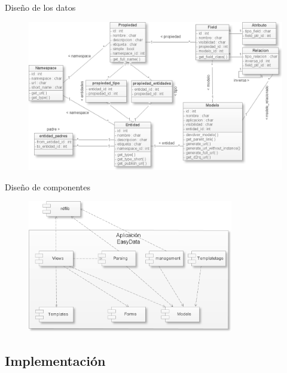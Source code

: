 \documentclass[spanish,xcolor=table,svgnames]{beamer}
\begin{document}
\begin{frame}{Diseño de los datos}
  \begin{figure}[H]
    \begin{center}
        \includegraphics[width=1.0\textwidth]{img/modelo_conceptual.png}
    \end{center}
    \label{fig:conceptual}
\end{figure}
\end{frame}

\begin{frame}{Diseño de componentes}
  \begin{figure}[H]
    \begin{center}
        \includegraphics[width=0.8\textwidth]{img/estructura.png}
    \end{center}
    \label{fig:estructura}
\end{figure}
\end{frame}

\subsection*{Implementación}
\end{document}
